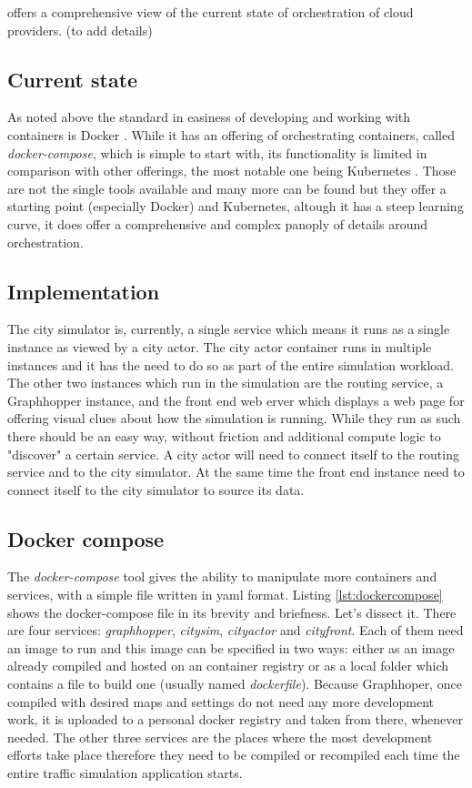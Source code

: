 \documentclass[conference]{IEEEtran}
\begin{document}
\cite{7922500} offers a comprehensive view of the current state of orchestration of cloud providers. (to add details)

\subsection{Current state}

As noted above the standard in easiness of developing and working with containers is Docker \citep{docker}. While it has an offering of orchestrating containers, called \textit{docker-compose}, which is simple to start with, its functionality is limited in comparison with other offerings, the most notable one being Kubernetes \citep{Kubernetes}. Those are not the single tools available and many more can be found but they offer a starting point (especially Docker) and Kubernetes, altough it has a steep learning curve, it does offer a comprehensive and complex panoply of details around orchestration.

\subsection{Implementation}

The city simulator is, currently, a single service which means it runs as a single instance as viewed by a city actor. The city actor container runs in multiple instances and it has the need to do so as part of the entire simulation workload. The other two instances which run in the simulation are the routing service, a Graphhopper instance, and the front end web erver which displays a web page for offering visual clues about how the simulation is running. While they run as such there should be an easy way, without friction and additional compute logic to "discover" a certain service. A city actor will need to connect itself to the routing service and to the city simulator. At the same time the front end instance need to connect itself to the city simulator to source its data.

\subsection{Docker compose}

The \textit{docker-compose} tool gives the ability to manipulate more containers and services, with a simple file written in yaml format. Listing \ref{lst:dockercompose} shows the docker-compose file in its brevity and briefness. Let's dissect it. There are four services: \textit{graphhopper}, \textit{citysim}, \textit{cityactor} and \textit{cityfront}. Each of them need an image to run and this image can be specified in two ways: either as an image already compiled and hosted on an container registry or as a local folder which contains a file to build one (usually named \textit{dockerfile}). Because Graphhoper, once compiled with desired maps and settings do not need any more development work, it is uploaded to a personal docker registry and taken from there, whenever needed. The other three services are the places where the most development efforts take place therefore they need to be compiled or recompiled each time the entire traffic simulation application starts.
\end{document}
